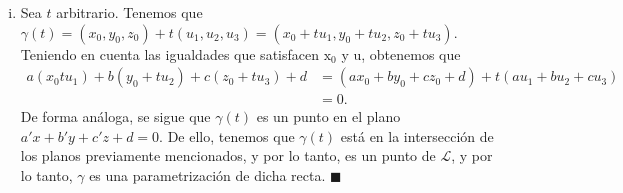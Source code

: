 \documentclass[12pt]{article}
\newcommand{\x}{\mathrm x}
\begin{document}
\begin{enumerate}
\begin{enumerate}[(i)]
    \item Sea $t$ arbitrario. Tenemos que $\gamma(t)=(x_0,y_0,z_0)+t(u_1,u_2,u_3)=(x_0+tu_1,y_0+tu_2,z_0+tu_3)$. Teniendo en cuenta las igualdades que satisfacen $\x_0$ y $\mathrm u$, obtenemos que
        \begin{align*}
            a(x_0tu_1) + b(y_0+tu_2) + c(z_0+tu_3) + d &= (ax_0 + by_0 + cz_0 + d) + t(au_1+bu_2+cu_3)\\
            &=0.
        \end{align*}
        De forma análoga, se sigue que $\gamma(t)$ es un punto en el plano $a'x+b'y+c'z+d=0$. De ello, tenemos que $\gamma(t)$ está en la intersección de los planos previamente mencionados, y por lo tanto,
        es un punto de $\mathcal{L}$, y por lo tanto, $\gamma$ es una parametrización de dicha recta. \hfill $\blacksquare$
\end{enumerate}


\end{enumerate}
\end{document}
